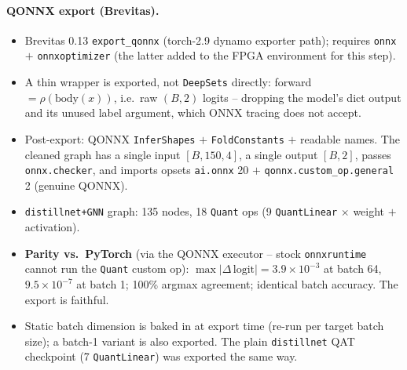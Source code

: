 \paragraph{QONNX export (Brevitas).}
\begin{itemize}
    \item Brevitas 0.13 \texttt{export\_qonnx} (torch-2.9 dynamo exporter
    path); requires \texttt{onnx} $+$ \texttt{onnxoptimizer} (the latter
    added to the FPGA environment for this step).
    \item A thin wrapper is exported, not \texttt{DeepSets} directly:
    forward $= \rho(\mathrm{body}(x))$, i.e.\ raw
    $(B, 2)$ logits -- dropping the model's dict output and its unused
    label argument, which ONNX tracing does not accept.
    \item Post-export: QONNX \texttt{InferShapes} $+$ \texttt{FoldConstants}
    $+$ readable names. The cleaned graph has a single input
    $[B, 150, 4]$, a single output $[B, 2]$, passes \texttt{onnx.checker},
    and imports opsets \texttt{ai.onnx} 20 $+$ \texttt{qonnx.custom\_op.general}
    2 (genuine QONNX).
    \item \texttt{distillnet+GNN} graph: 135 nodes, 18 \texttt{Quant} ops
    (9 \texttt{QuantLinear} $\times$ weight $+$ activation).
    \item \textbf{Parity vs.\ PyTorch} (via the QONNX executor -- stock
    \texttt{onnxruntime} cannot run the \texttt{Quant} custom op):
    $\max|\Delta\,\mathrm{logit}| = 3.9\times10^{-3}$ at batch 64,
    $9.5\times10^{-7}$ at batch 1; 100\% argmax agreement; identical batch
    accuracy. The export is faithful.
    \item Static batch dimension is baked in at export time (re-run per
    target batch size); a batch-1 variant is also exported. The plain
    \texttt{distillnet} QAT checkpoint (7 \texttt{QuantLinear}) was exported
    the same way.
\end{itemize}

